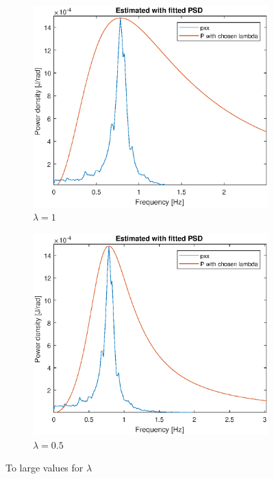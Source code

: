 \begin{figure}[H]
\begin{subfigure}{0.5\textwidth}
    \includegraphics[width=1\linewidth]{Part2_pics/p2d_lambda_1.eps}
    \caption{$\lambda = 1$}
\end{subfigure}
\begin{subfigure}{0.5\textwidth}
    \includegraphics[width=1\linewidth]{Part2_pics/p2d_lambda_05.eps}
    \caption{$\lambda = 0.5$}
\end{subfigure}
\caption{To large values for $\lambda$}
\label{fig:p2d1}
\end{figure}

